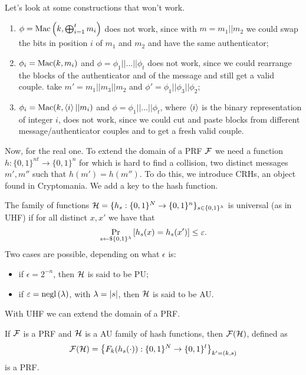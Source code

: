 Let's look at some constructions that won't work.
\begin{enumerate}
	\item $\phi = \GenericMac\left(k, \bigxor_{i=1}^{t} m_i\right)$ does not work, since with $m = m_1 || m_2$ we could swap the bits in position $i$ of $m_1$ and $m_2$ and have the same authenticator;
	\item $\phi_i = \GenericMac(k, m_i)$ and $\phi = \phi_1 || \dots || \phi_t$ does not work, since we could rearrange the blocks of the authenticator and of the message and still get a valid couple. \ie take $m' = m_1 || m_3 || m_2$ and $\phi' = \phi_1 || \phi_3 || \phi_2$;
	\item $\phi_i = \GenericMac(k, \repr{i} || m_i)$ and $\phi = \phi_1 || \dots || \phi_t$, where $\repr{i}$ is the binary representation of integer $i$, does not work, since we could cut and paste blocks from different message/authenticator couples and to get a fresh valid couple.
\end{enumerate}

Now, for the real one.
To extend the domain of a \ac{PRF} $\F$ we need a function $h : \{0,1\}^{nt} \to \{0,1\}^{n}$ for which is hard to find a collision, \ie two distinct messages $m', m''$ such that $h(m') = h(m'')$.
To do this, we introduce \acp{CRH}, an object found in Cryptomania.
We add a key to the hash function.

\begin{definition}
	The family of functions $\H = \{ h_s : \{0,1\}^{N} \to \{0,1\}^{n} \}_{s \in \{0,1\}^{\lambda}}$ is universal (as in \ac{UHF}) if for all distinct $x, x'$ we have that
	\begin{equation*}
		\Pr[s \rand{\{0,1\}^{\lambda}}]{h_s(x) = h_s(x')} \le \epsilon.
	\end{equation*}
	Two cases are possible, depending on what $\epsilon$ is:
	\begin{itemize}
		\item if $\epsilon = 2^{-n}$, then $\H$ is said to be \ac{PU};
		\item if $\epsilon = \negl{\lambda}$, with $\lambda = \abs{s}$, then $\H$ is said to be \ac{AU}. \qedhere
	\end{itemize}
\end{definition}

With \ac{UHF} we can extend the domain of a \ac{PRF}.
\begin{theorem} \label{thm:uhf-prf-extension}
	If $\F$ is a \ac{PRF} and $\H$ is a \ac{AU} family of hash functions, then $\F(\H)$, defined as
	\begin{equation*}
		\F(\H) = \left\{ F_k(h_s(\cdot)) : \{0,1\}^{N} \to \{0,1\}^{l} \right\}_{k' = (k,s)}
	\end{equation*}
	is a \ac{PRF}.
\end{theorem}

